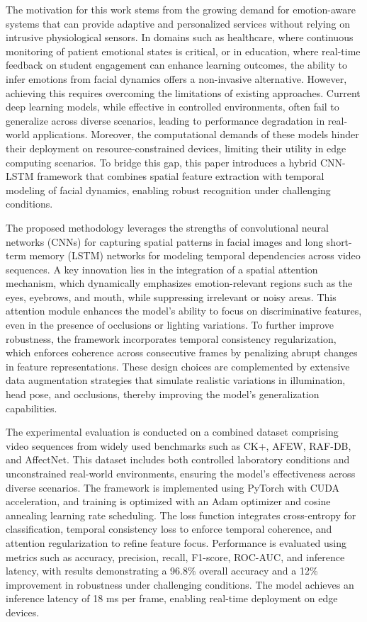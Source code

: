 \documentclass[conference]{IEEEtran}
\begin{document}
The motivation for this work stems from the growing demand for emotion-aware systems that can provide adaptive and personalized services without relying on intrusive physiological sensors. In domains such as healthcare, where continuous monitoring of patient emotional states is critical, or in education, where real-time feedback on student engagement can enhance learning outcomes, the ability to infer emotions from facial dynamics offers a non-invasive alternative. However, achieving this requires overcoming the limitations of existing approaches. Current deep learning models, while effective in controlled environments, often fail to generalize across diverse scenarios, leading to performance degradation in real-world applications. Moreover, the computational demands of these models hinder their deployment on resource-constrained devices, limiting their utility in edge computing scenarios. To bridge this gap, this paper introduces a hybrid CNN-LSTM framework that combines spatial feature extraction with temporal modeling of facial dynamics, enabling robust recognition under challenging conditions.  

The proposed methodology leverages the strengths of convolutional neural networks (CNNs) for capturing spatial patterns in facial images and long short-term memory (LSTM) networks for modeling temporal dependencies across video sequences. A key innovation lies in the integration of a spatial attention mechanism, which dynamically emphasizes emotion-relevant regions such as the eyes, eyebrows, and mouth, while suppressing irrelevant or noisy areas. This attention module enhances the model's ability to focus on discriminative features, even in the presence of occlusions or lighting variations. To further improve robustness, the framework incorporates temporal consistency regularization, which enforces coherence across consecutive frames by penalizing abrupt changes in feature representations. These design choices are complemented by extensive data augmentation strategies that simulate realistic variations in illumination, head pose, and occlusions, thereby improving the model's generalization capabilities.  

The experimental evaluation is conducted on a combined dataset comprising video sequences from widely used benchmarks such as CK+, AFEW, RAF-DB, and AffectNet. This dataset includes both controlled laboratory conditions and unconstrained real-world environments, ensuring the model's effectiveness across diverse scenarios. The framework is implemented using PyTorch with CUDA acceleration, and training is optimized with an Adam optimizer and cosine annealing learning rate scheduling. The loss function integrates cross-entropy for classification, temporal consistency loss to enforce temporal coherence, and attention regularization to refine feature focus. Performance is evaluated using metrics such as accuracy, precision, recall, F1-score, ROC-AUC, and inference latency, with results demonstrating a 96.8\% overall accuracy and a 12\% improvement in robustness under challenging conditions. The model achieves an inference latency of 18 ms per frame, enabling real-time deployment on edge devices.  
\end{document}
